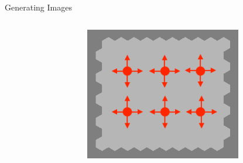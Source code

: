 \documentclass[10pt,xcolor=svgnames]{beamer} %
\begin{document}
\begin{frame}{Generating Images}
\begin{columns}
\begin{figure}
    \end{figure}
    \vspace{-0.7cm}
    \begin{figure}
        \centering
        \includegraphics[width=0.8\textwidth]{pictures/img3_cut0_seeds_var.png}
    \end{figure}
\end{columns}
\end{frame}
\end{document}

